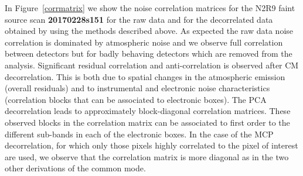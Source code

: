 In Figure~\ref{corrmatrix} we show the noise correlation matrices for the N2R9
faint source scan {\bf 20170228s151} for the raw data and for the decorrelated
data obtained by using the methods described above. As expected the raw data
noise correlation is dominated by atmospheric noise and we observe full
correlation between detectors but for badly behaving detectors which are removed
from the analysis. Significant residual correlation and anti-correlation is
observed after CM decorrelation.  This is both due to spatial changes in the
atmospheric emission (overall residuals) and to instrumental and electronic
noise characteristics (correlation blocks that can be associated to electronic
boxes).  The PCA decorrelation leads to approximately block-diagonal correlation
matrices. These observed blocks in the correlation matrix can be associated to
first order to the different sub-bands in each of the electronic boxes. In the
case of the MCP decorrelation, for which only those pixels highly correlated to
the pixel of interest are used, we observe that the correlation matrix is more
diagonal as in the two other derivations of the common mode.


